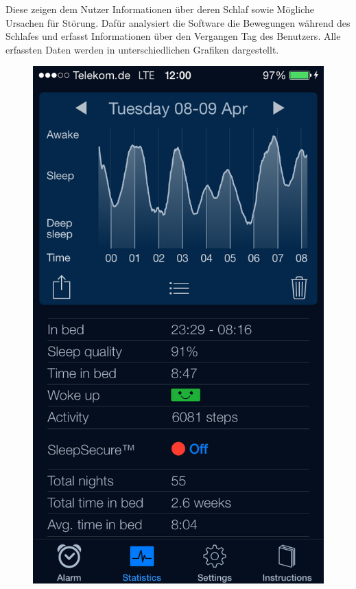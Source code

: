 Diese zeigen dem Nutzer Informationen über deren Schlaf sowie Mögliche Ursachen für Störung.
Dafür analysiert die Software die Bewegungen während des Schlafes und erfasst Informationen über den Vergangen Tag des Benutzers.
Alle erfassten Daten werden in unterschiedlichen Grafiken dargestellt.

 

\begin{figure}[]
  \centering
  \begin{minipage}[b]{0.47\textwidth}
    \centering
    \includegraphics[scale=0.3]{images/SleepCycle/Detail} 

\end{minipage}
\end{figure}
